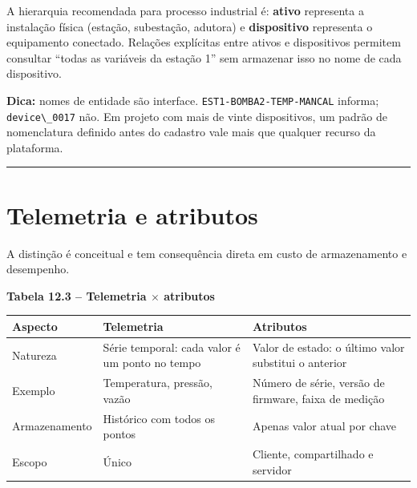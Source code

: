 A hierarquia recomendada para processo industrial é: \textbf{ativo} representa a instalação física (estação, subestação, adutora) e \textbf{dispositivo} representa o equipamento conectado. Relações explícitas entre ativos e dispositivos permitem consultar ``todas as variáveis da estação 1'' sem armazenar isso no nome de cada dispositivo.

\begin{caixadica}

\textbf{Dica:} nomes de entidade são interface. \passthrough{\lstinline!EST1-BOMBA2-TEMP-MANCAL!} informa; \passthrough{\lstinline!device\_0017!} não. Em projeto com mais de vinte dispositivos, um padrão de nomenclatura definido antes do cadastro vale mais que qualquer recurso da plataforma.

\end{caixadica}

\begin{center}\rule{0.5\linewidth}{0.5pt}\end{center}

\section{Telemetria e atributos}\label{telemetria-e-atributos}

A distinção é conceitual e tem consequência direta em custo de armazenamento e desempenho.

\textbf{Tabela 12.3 -- Telemetria \ensuremath{\times} atributos}

\begin{longtable}[]{@{}
  >{\raggedright\arraybackslash}p{}
  >{\raggedright\arraybackslash}p{}
  >{\raggedright\arraybackslash}p{}@{}}
\toprule\noalign{}
\begin{minipage}[b]{\linewidth}\raggedright
Aspecto
\end{minipage} & \begin{minipage}[b]{\linewidth}\raggedright
Telemetria
\end{minipage} & \begin{minipage}[b]{\linewidth}\raggedright
Atributos
\end{minipage} \\
\midrule\noalign{}
\endhead
\bottomrule\noalign{}
\endlastfoot
Natureza & Série temporal: cada valor é um ponto no tempo & Valor de estado: o último valor substitui o anterior \\
Exemplo & Temperatura, pressão, vazão & Número de série, versão de firmware, faixa de medição \\
Armazenamento & Histórico com todos os pontos & Apenas valor atual por chave \\
Escopo & Único & Cliente, compartilhado e servidor \\
\end{longtable}

